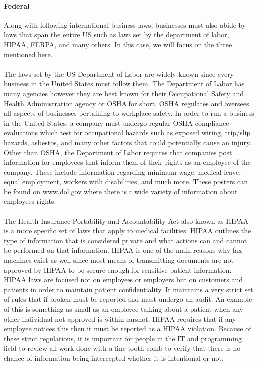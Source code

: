 \documentclass[notitlepage,a4paper,12pt]{article}
\begin{document}
\paragraph{Federal}Along with following international business laws, businesses must also abide by laws that span the entire US such as laws set by the department of labor, HIPAA, FERPA, and many others. In this case, we will focus on the three mentioned here.
\paragraph{}The laws set by the US Department of Labor are widely known since every business in the United States must follow them. The Department of Labor has many agencies however they are best known for their Occupational Safety and Health Administration agency or OSHA for short. OSHA regulates and oversees all aspects of businesses pertaining to workplace safety. In order to run a business in the United States, a company must undergo regular OSHA compliance evaluations which test for occupational hazards such as exposed wiring, trip/slip hazards, asbestos, and many other factors that could potentially cause an injury. Other than OSHA, the Department of Labor requires that companies post information for employees that inform them of their rights as an employee of the company. These include information regarding minimum wage, medical leave, equal employment, workers with disabilities, and much more. These posters can be found on www.dol.gov where there is a wide variety of information about employees rights.
\paragraph{}The Health Insurance Portability and Accountability Act also known as HIPAA is a more specific set of laws that apply to medical facilities. HIPAA outlines the type of information that is considered private and what actions can and cannot be performed on that information. HIPAA is one of the main reasons why fax machines exist as well since most means of transmitting documents are not approved by HIPAA to be secure enough for sensitive patient information. HIPAA laws are focused not on employees or employers but on customers and patients in order to maintain patient confidentiality. It maintains a very strict set of rules that if broken must be reported and must undergo an audit. An example of this is something as small as an employee talking about a patient when any other individual not approved is within earshot. HIPAA requires that if any employee notices this then it must be reported as a HIPAA violation. Because of these strict regulations, it is important for people in the IT and programming field to review all work done with a fine tooth comb to verify that there is no chance of information being intercepted whether it is intentional or not.
\end{document}
